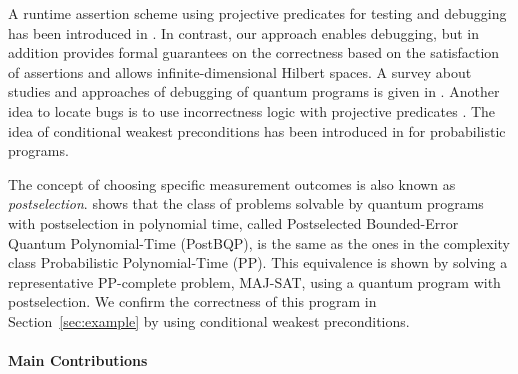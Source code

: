 \documentclass[a4paper,UKenglish,cleveref, autoref, thm-restate]{lipics-v2021}
\begin{document}
A runtime assertion scheme using projective predicates for testing and debugging has been introduced in \cite{projectionAssertions}. In contrast, our approach enables debugging, but in addition provides formal guarantees on the correctness based on the satisfaction of assertions and allows infinite-dimensional Hilbert spaces. A survey about studies and approaches of debugging of quantum programs is given in \cite{NeedOfToolsDebuggingQuantumPrograms}.
Another idea to locate bugs is to use incorrectness logic with projective predicates \cite{YanIncorrectnessLogic}. The idea of conditional weakest preconditions has been introduced in \cite{Nori, conditioningProb} for probabilistic programs.

The concept of choosing specific measurement outcomes is also known as \emph{postselection}. \cite{postbqp} shows that the class of problems solvable by quantum programs with postselection in polynomial time, called Postselected Bounded-Error Quantum Polynomial-Time (PostBQP), is the same as the ones in the complexity class Probabilistic Polynomial-Time (PP). This equivalence is shown by solving a representative PP-complete problem, MAJ-SAT, using a quantum program with postselection. We confirm the correctness of this program in Section~\ref{sec:example} by using conditional weakest preconditions.

\paragraph*{Main Contributions}
\end{document}
